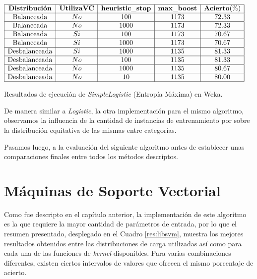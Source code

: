 
\begin{table}[htb] 
\centering

$
\begin{array}{|c|c|c|c|c|}
      \hline
      \mathbf{Distribuci\acute{o}n} & \mathbf{Utiliza VC} & \mathbf{heuristic\_stop} & \mathbf{max\_boost} & \mathbf{Acierto(\%)} \\
      \hline
      \mathrm{Balanceada}	&	No	&	100	&	1173	&	72.33	\\
      \hline
      \mathrm{Balanceada}	&	No	&  1000	&	1173	&	72.33	\\
      \hline
      \mathrm{Balanceada}	&	Si	&	100	&	1173	&	70.67	\\
      \hline
      \mathrm{Balanceada}	&	Si	&  1000	&	1173	&	70.67	\\
      \hline
      \mathrm{Desbalanceada}	&	Si	&  1000	&	1135	&	81.33	\\
      \hline
      \mathrm{Desbalanceada}	&	No	&	100	&	1135	&	81.33	\\
      \hline
      \mathrm{Desbalanceada}	&	No	&  1000	&	1135	&	80.67	\\
      \hline
      \mathrm{Desbalanceada}	&	No	&	 10	&	1135	&	80.00	\\
      \hline
\end{array}
$
\caption{Resultados de ejecuci\'on de \textit{SimpleLogistic} (Entrop\'ia M\'axima) en Weka.}
\label{res:simplelogistic}
\end{table}

De manera similar a \textit{Logistic}, la otra implementaci\'on para el mismo algoritmo, observamos la influencia de la cantidad de instancias de entrenamiento por sobre la distribuci\'on equitativa de las mismas entre categor\'ias.
\newline

Pasamos luego, a la evaluaci\'on del siguiente algoritmo antes de establecer unas comparaciones finales entre todos los m\'etodos descriptos.


\section{M\'aquinas de Soporte Vectorial}

Como fue descripto en el cap\'itulo anterior, la implementaci\'on de este algoritmo es la que requiere la mayor cantidad de par\'ametros de entrada, por lo que el resumen presentado, desplegado en el Cuadro \ref{res:libsvm}, muestra los mejores resultados obtenidos entre las distribuciones de carga utilizadas as\'i como para cada una de las funciones de \textit{kernel} disponibles. Para varias combinaciones diferentes, existen ciertos intervalos de valores que ofrecen el mismo porcentaje de acierto.
\newline

